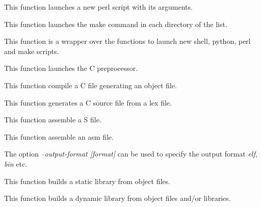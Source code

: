          {
	   This function launches a new perl script with its arguments.
	 }

         {
	   This function launches the make command in each directory of
	   the list.
	 }

         {
	   This function is a wrapper over the functions to launch new
	   shell, python, perl and make scripts.
	 }

         {
	   This function launches the C preprocessor.
	 }

         {
	   This function compile a C file generating an object file.
	 }

         {
	   This function generates a C source file from a lex file.
	 }

         {
	   This function assemble a S file.
	 }

         {
	   This function assemble an asm file.

	   The option \textit{--output-format [format]} can be used to
	   specify the output format \textit{elf}, \textit{bin} etc.
	 }

         {
	   This function builds a static library from object files.
	 }

         {
	   This function builds a dynamic library from object files and/or
	   libraries.
	 }


